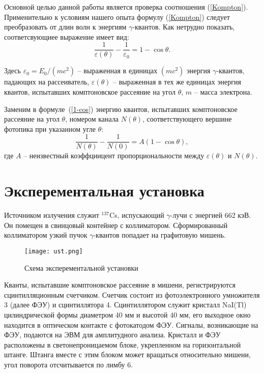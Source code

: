 	Основной целью данной работы является проверка соотношения (\ref{Kompton}). Применительно к условиям нашего опыта формулу (\ref{Kompton}) следует преобразовать от длин волн к энергиям $\gamma$-квантов. Как нетрудно показать, соответсвующиее выражение имеет вид:
	\begin{equation}
		\label{1-cos}
		\tag{$\star\star$}
		\frac{1}{\varepsilon(\theta)} - \frac{1}{\varepsilon_0} = 1 - \cos \theta.
	\end{equation}

	Здесь $\varepsilon_0 = E_0/(mc^2)$ -- выраженная в единицах $(mc^2)$ энергия $\gamma$-квантов, падающих на рассеиватель, $\varepsilon(\theta)$ -- выраженная в тех же единицах энергия квантов, испытавших комптоновское рассеяние на угол $\theta$, $m$ -- масса электрона.
	
	Заменим в формуле~(\ref{1-cos}) энергию квантов, испытавших комптоновское рассеяние на угол $\theta$, номером канала $N(\theta)$, соответствующего вершине фотопика при указанном угле $\theta$:
	\begin{equation}
		\label{kek}
		\tag{$\star \star \star$}
		\frac{1}{N(\theta)} - \frac{1}{N(0)} = A (1- \cos \theta),
	\end{equation}
	где $A$ -- неизвестный коэффциицент пропорциональности между $\varepsilon(\theta)$ и $N(\theta)$.

    \section*{Эксперементальная установка}

    Источником излучения служит $^{137}$Cs, испускающий $\gamma$-лучи с энергией 662 кэВ. 
    Он помещен в свинцовый контейнер с коллиматором. 
    Сформированный коллиматором узкий пучок $\gamma$-квантов попадает на графитовую мишень.

    \begin{figure}
        \centering
        \texttt{[image: ust.png]}
        \caption{Схема эксперементальной установки}
        \label{fig:ust}
    \end{figure}

    Кванты, испытавшие комптоновское рассеяние в мишени, 
    регистрируются сцинтилляционным счетчиком. 
    Счетчик состоит из фотоэлектронного умножителя 3 (далее ФЭУ) и сцинтиллятора 4. 
    Сцинтиллятором служит кристалл NaI(Tl) цилиндрической формы диаметром 40 мм и высотой 40 мм, 
    его выходное окно находится в оптическом контакте с фотокатодом ФЭУ. 
    Сигналы, возникающие на ФЭУ, подаются на ЭВМ для амплитудного анализа. 
    Кристалл и ФЭУ расположены в светонепроницаемом блоке, укрепленном на горизонтальной штанге. 
    Штанга вместе с этим блоком может вращаться относительно мишени, 
    угол поворота отсчитывается по лимбу 6.

